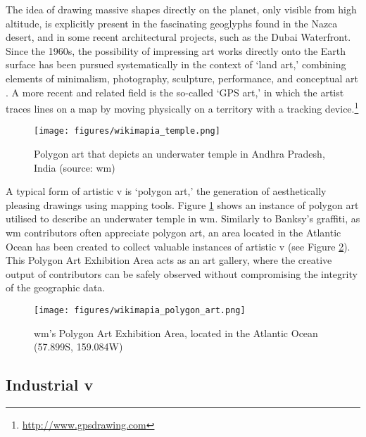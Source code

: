 \documentclass{article} \usepackage{graphicx,xspace}
\newcommand{\footurl}[1]{\footnote{\url{#1}}}
\begin{document}
The idea of drawing massive shapes directly on the planet, only visible from high altitude, is explicitly present in the fascinating geoglyphs found in the Nazca desert, and in some recent architectural projects, such as the Dubai Waterfront.
Since the 1960s, the possibility of impressing art works directly onto the Earth surface has been pursued systematically in the context of `land art,' combining elements of minimalism, photography, sculpture, performance, and conceptual art \citep{tufnell:2006:landart}.
A more recent and related field is the so-called `GPS art,' in which the artist traces lines on a map by moving physically on a territory with a tracking device.\footurl{http://www.gpsdrawing.com}  




\begin{figure}[t]
\centering
\texttt{[image: figures/wikimapia\_temple.png]}
\caption{Polygon art that depicts an underwater temple in Andhra Pradesh, India (source: \gls{wm})}
\label{fig:wm_temple}
\end{figure} 

A typical form of artistic \gls{v} is `polygon art,' the generation of aesthetically pleasing drawings using mapping tools.
Figure \ref{fig:wm_temple} shows an instance of polygon art utilised to describe an underwater temple in \gls{wm}.
Similarly to Banksy's graffiti, as \gls{wm} contributors often appreciate polygon art, an area located in the Atlantic Ocean has been created to collect valuable instances of artistic \gls{v} (see Figure \ref{fig:wm_polygon_art_exhib}).
This Polygon Art Exhibition Area acts as an art gallery, where the creative output of contributors can be safely observed without compromising the integrity of the geographic data.

\begin{figure}
\centering
\texttt{[image: figures/wikimapia\_polygon\_art.png]}
\caption{\gls{wm}'s Polygon Art Exhibition Area, located in the Atlantic Ocean (57.899S, 159.084W)}
\label{fig:wm_polygon_art_exhib}
\end{figure}

\subsection{Industrial \protect\gls{v}}
\end{document}
